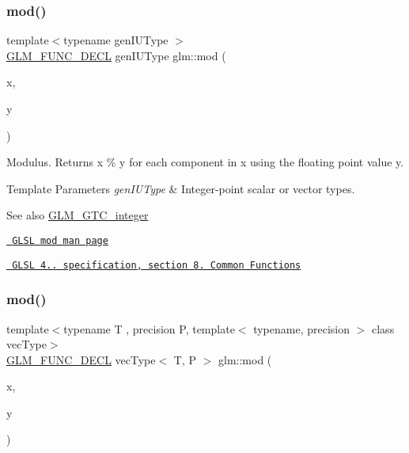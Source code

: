 \subsubsection{\texorpdfstring{mod()}{mod()}\hspace{0.1cm}{\footnotesize\ttfamily [1/3]}}
{\footnotesize\ttfamily template$<$typename gen\+I\+U\+Type $>$ \\
\mbox{\hyperlink{setup_8hpp_ab2d052de21a70539923e9bcbf6e83a51}{G\+L\+M\+\_\+\+F\+U\+N\+C\+\_\+\+D\+E\+CL}} gen\+I\+U\+Type glm\+::mod (\begin{DoxyParamCaption}\item[{gen\+I\+U\+Type}]{x,  }\item[{gen\+I\+U\+Type}]{y }\end{DoxyParamCaption})}

Modulus. Returns x \% y for each component in x using the floating point value y.


\begin{DoxyTemplParams}{Template Parameters}
{\em gen\+I\+U\+Type} & Integer-\/point scalar or vector types.\\
\hline
\end{DoxyTemplParams}
\begin{DoxySeeAlso}{See also}
\mbox{\hyperlink{group__gtc__integer}{G\+L\+M\+\_\+\+G\+T\+C\+\_\+integer}} 

\href{http://www.opengl.org/sdk/docs/manglsl/xhtml/mod.xml}{\texttt{ G\+L\+SL mod man page}} 

\href{http://www.opengl.org/registry/doc/GLSLangSpec.4.20.8.pdf}{\texttt{ G\+L\+SL 4.. specification, section 8. Common Functions}} 
\end{DoxySeeAlso}
\mbox{\label{group__gtc__integer_ga1d3f62c015315540cebf1f915b67dd9c}} 
\subsubsection{\texorpdfstring{mod()}{mod()}\hspace{0.1cm}{\footnotesize\ttfamily [2/3]}}
{\footnotesize\ttfamily template$<$typename T , precision P, template$<$ typename, precision $>$ class vec\+Type$>$ \\
\mbox{\hyperlink{setup_8hpp_ab2d052de21a70539923e9bcbf6e83a51}{G\+L\+M\+\_\+\+F\+U\+N\+C\+\_\+\+D\+E\+CL}} vec\+Type$<$ T, P $>$ glm\+::mod (\begin{DoxyParamCaption}\item[{vec\+Type$<$ T, P $>$ const \&}]{x,  }\item[{T}]{y }\end{DoxyParamCaption})}

